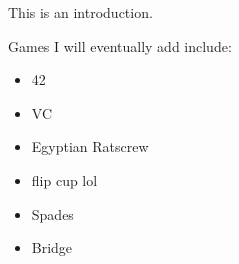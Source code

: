 
This is an introduction.

Games I will eventually add include:

\begin{itemize}
    \item 42
    \item VC
    \item Egyptian Ratscrew
    \item flip cup lol
    \item Spades
    \item Bridge
\end{itemize}
